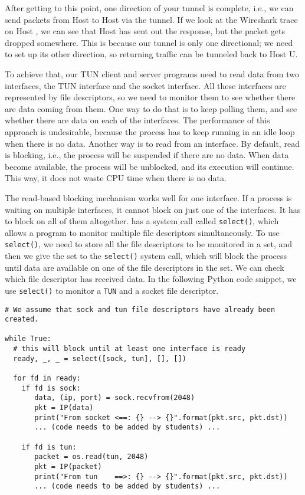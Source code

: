 After getting to this point, one direction of your tunnel is complete, i.e.,
we can send packets from Host \hostu to Host \hostv via the tunnel. If we look at the
Wireshark trace on Host \hostv, we can see that Host \hostv has sent out the 
response, but the packet gets dropped somewhere. This is because 
our tunnel is only one directional; we need to set up its other direction, so returning
traffic can be tunneled back to Host U.


To achieve that, our TUN client and server programs need to read data from two interfaces, 
the TUN interface and the socket interface.  
All these interfaces are represented by file descriptors, so we need to
monitor them to see whether there are data coming from them.
One way to do that is to keep polling them, and
see whether there are data on each of the interfaces. The performance of this approach is
undesirable, because the process has to keep running in an idle loop when there is no data.
Another way is to read from an interface.  By default, read is blocking, i.e., the process will
be suspended if there are no data. When data become available, the process will be unblocked,
and its execution will continue. This way, it does not waste CPU time when there is no data.

The read-based blocking mechanism works well for one interface. If a process is waiting on
multiple interfaces, it cannot block on just one of the interfaces. It has to block on all of
them altogether.  \linux has a system call called \texttt{select()}, which
allows a program to monitor multiple file descriptors simultaneously.
To use \texttt{select()}, we need to store all the file descriptors to be monitored in a set,
and then we give the set to the \texttt{select()} system
call, which will block the process until data are available on one of the
file descriptors in the set. We can check which
file descriptor has received data. In the following Python code snippet,
we use \texttt{select()} to monitor a \texttt{TUN} and a socket file
descriptor.


\begin{lstlisting}
# We assume that sock and tun file descriptors have already been created.

while True:
  # this will block until at least one interface is ready
  ready, _, _ = select([sock, tun], [], [])

  for fd in ready:
    if fd is sock:
       data, (ip, port) = sock.recvfrom(2048)
       pkt = IP(data)
       print("From socket <==: {} --> {}".format(pkt.src, pkt.dst))
       ... (code needs to be added by students) ...

    if fd is tun:
       packet = os.read(tun, 2048)
       pkt = IP(packet)
       print("From tun    ==>: {} --> {}".format(pkt.src, pkt.dst))
       ... (code needs to be added by students) ...
\end{lstlisting}
 

